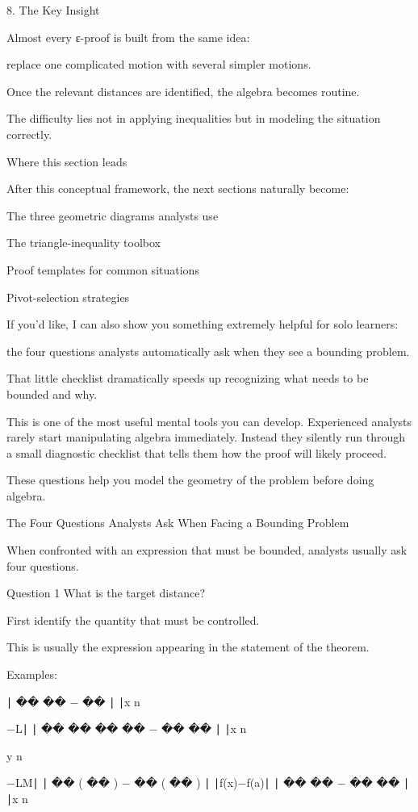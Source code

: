 8. The Key Insight

Almost every ε-proof is built from the same idea:

replace one complicated motion with several simpler motions.

Once the relevant distances are identified, the algebra becomes routine.

The difficulty lies not in applying inequalities but in modeling the situation correctly.

Where this section leads

After this conceptual framework, the next sections naturally become:

The three geometric diagrams analysts use

The triangle-inequality toolbox

Proof templates for common situations

Pivot-selection strategies

If you'd like, I can also show you something extremely helpful for solo learners:

the four questions analysts automatically ask when they see a bounding problem.

That little checklist dramatically speeds up recognizing what needs to be bounded and why.


This is one of the most useful mental tools you can develop. Experienced analysts rarely start manipulating algebra immediately. Instead they silently run through a small diagnostic checklist that tells them how the proof will likely proceed.

These questions help you model the geometry of the problem before doing algebra.

The Four Questions Analysts Ask When Facing a Bounding Problem

When confronted with an expression that must be bounded, analysts usually ask four questions.

Question 1
What is the target distance?

First identify the quantity that must be controlled.

This is usually the expression appearing in the statement of the theorem.

Examples:

∣
��
��
−
��
∣
∣x
n
	​

−L∣
∣
��
��
��
��
−
��
��
∣
∣x
n
	​

y
n
	​

−LM∣
∣
��
(
��
)
−
��
(
��
)
∣
∣f(x)−f(a)∣
∣
��
��
−
��
��
∣
∣x
n
	​

